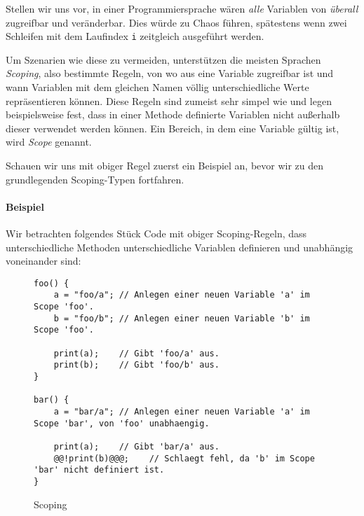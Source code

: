 
Stellen wir uns vor, in einer Programmiersprache wären \textit{alle} Variablen von \textit{überall} zugreifbar und veränderbar. Dies würde zu Chaos führen, spätestens wenn zwei Schleifen mit dem Laufindex \texttt{i} zeitgleich ausgeführt werden.

Um Szenarien wie diese zu vermeiden, unterstützen die meisten Sprachen \textit{Scoping}, also bestimmte Regeln, von wo aus eine Variable zugreifbar ist und wann Variablen mit dem gleichen Namen völlig unterschiedliche Werte repräsentieren können. Diese Regeln sind zumeist sehr simpel wie und legen beispielsweise fest, dass in einer Methode definierte Variablen nicht außerhalb dieser verwendet werden können. Ein Bereich, in dem eine Variable gültig ist, wird \textit{Scope} genannt.

Schauen wir uns mit obiger Regel zuerst ein Beispiel an, bevor wir zu den grundlegenden Scoping-Typen fortfahren.

\paragraph{Beispiel}
	Wir betrachten folgendes Stück Code mit obiger Scoping-Regeln, dass unterschiedliche Methoden unterschiedliche Variablen definieren und unabhängig voneinander sind:
	\begin{figure}[H]
		\centering
		\begin{lstlisting}
foo() {
	a = "foo/a"; // Anlegen einer neuen Variable 'a' im Scope 'foo'.
	b = "foo/b"; // Anlegen einer neuen Variable 'b' im Scope 'foo'.

	print(a);    // Gibt 'foo/a' aus.
	print(b);    // Gibt 'foo/b' aus.
}

bar() {
	a = "bar/a"; // Anlegen einer neuen Variable 'a' im Scope 'bar', von 'foo' unabhaengig.

	print(a);    // Gibt 'bar/a' aus.
	@@!print(b)@@@;    // Schlaegt fehl, da 'b' im Scope 'bar' nicht definiert ist.
}
		\end{lstlisting}
		\caption{Scoping}
	\end{figure}

